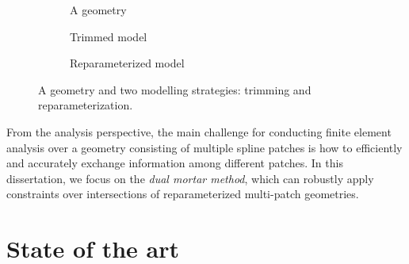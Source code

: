 \begin{figure}[ht]
	\captionsetup[subfigure]{labelformat=empty, font = footnotesize}
	\centering
	\begin{subfigure}[b]{0.32\textwidth}
		\centering
		
		\caption{A geometry}
	\end{subfigure}
	\begin{subfigure}[b]{0.32\textwidth}
		\centering
		
		\caption{Trimmed model}
	\end{subfigure}
	\begin{subfigure}[b]{0.32\textwidth}
		\centering
		
		\caption{Reparameterized model}
	\end{subfigure}
	\caption{A geometry and two modelling strategies: trimming and reparameterization.}
	\label{fig:geometries}
\end{figure}

From the analysis perspective, the main challenge for conducting finite element analysis over a geometry consisting of multiple spline patches is how to efficiently and accurately exchange information among different patches. In this dissertation, we focus on the \textit{dual mortar method}, which can robustly apply constraints over intersections of reparameterized multi-patch geometries.  

\section{State of the art}